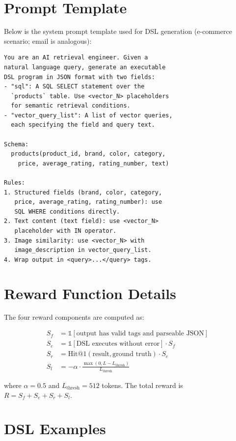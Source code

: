 \documentclass[11pt]{article}
\begin{document}
\appendix

\section{Prompt Template}
\label{app:prompt}

Below is the system prompt template used for DSL generation (e-commerce scenario; email is analogous):

\begin{lstlisting}
You are an AI retrieval engineer. Given a
natural language query, generate an executable
DSL program in JSON format with two fields:
- "sql": A SQL SELECT statement over the
  `products` table. Use <vector_N> placeholders
  for semantic retrieval conditions.
- "vector_query_list": A list of vector queries,
  each specifying the field and query text.

Schema:
  products(product_id, brand, color, category,
    price, average_rating, rating_number, text)

Rules:
1. Structured fields (brand, color, category,
   price, average_rating, rating_number): use
   SQL WHERE conditions directly.
2. Text content (text field): use <vector_N>
   placeholder with IN operator.
3. Image similarity: use <vector_N> with
   image_description in vector_query_list.
4. Wrap output in <query>...</query> tags.
\end{lstlisting}

\section{Reward Function Details}
\label{app:reward}

The four reward components are computed as:

\begin{align}
S_f &= \mathbb{1}[\text{output has valid tags and parseable JSON}] \\
S_e &= \mathbb{1}[\text{DSL executes without error}] \cdot S_f \\
S_r &= \text{Hit@1}(\text{result}, \text{ground truth}) \cdot S_e \\
S_l &= -\alpha \cdot \frac{\max(0, L - L_\text{thresh})}{L_\text{thresh}}
\end{align}

where $\alpha = 0.5$ and $L_\text{thresh} = 512$ tokens. The total reward is $R = S_f + S_e + S_r + S_l$.

\section{DSL Examples}
\label{app:examples}
\end{document}
